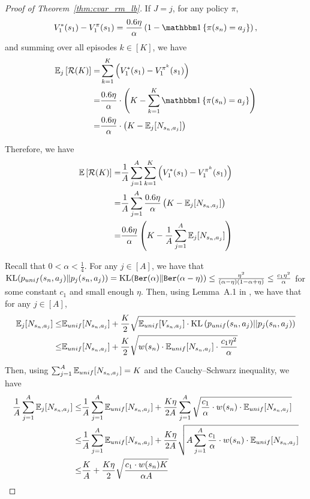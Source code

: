 \begin{proof}[Proof of Theorem~\ref{thm:cvar_rm_lb}]
	If $J=j$, for any policy $\pi$,
	\begin{align}
		V^{*}_1(s_1) - V^{\pi}_1(s_1) = \frac{0.6 \eta}{\alpha} \sbr{1-\indicator{\pi(s_n)=a_{j}}} , \label{eq:lb_proof_suboptimality_2}
	\end{align}
	and summing over all episodes $k \in [K]$, we have
	\begin{align*}
		\ex_j \mbr{\cR(K)} = & \sum_{k=1}^{K} \sbr{V^{*}_1(s_1)-V^{\pi^k}_1(s_1)}
		\\
		= & \frac{0.6 \eta}{\alpha} \cdot \sbr{K - \sum_{k=1}^{K} \indicator{\pi(s_n)=a_{j}}} 
		\\
		= & \frac{0.6 \eta}{\alpha} \cdot \sbr{K - \ex_j[N_{s_n,a_j}]} 
	\end{align*}
	
	Therefore, we have
	\begin{align}
		\mathbb{E} \left[ \mathcal{R}(K) \right] = &  \frac{1}{A} \sum_{j=1}^{A} \sum_{k=1}^{K} \left( V^{*}_1(s_1)-V^{\pi^k}_1(s_1) \right)
		\nonumber\\
		= & \frac{1}{A} \sum_{j=1}^{A} \frac{0.6 \eta}{\alpha} \left( K-\mathbb{E}_j[N_{s_n,a_j}]  \right) 
		\nonumber\\
		= & \frac{0.6 \eta}{\alpha} \left( K-\frac{1}{A} \sum_{j=1}^{A} \mathbb{E}_j[N_{s_n,a_j}]  \right) 
		\label{eq:regret_lb_half_2}
	\end{align}
	
	Recall that $0<\alpha<\frac{1}{4}$.
	For any $j \in [A]$, we have that $\textup{KL}(p_{unif}(s_n,a_j)\|p_j(s_n,a_j)) = \textup{KL}(\mathtt{Ber}(\alpha)\|\mathtt{Ber}(\alpha-\eta)) \leq \frac{\eta^2}{(\alpha-\eta) (1-\alpha+\eta)} \leq  \frac{c_1 \eta^2}{\alpha}$ for some constant $c_1$ and small enough $\eta$.
	Then, using Lemma~A.1 in \citep{auer2002nonstochastic}, we have that for any $j \in [A]$,
	\begin{align*}
		\mathbb{E}_j[N_{s_n,a_j}] \leq & \mathbb{E}_{unif}[N_{s_n,a_j}] + \frac{K}{2} \sqrt{ \mathbb{E}_{unif}[V_{s_n,a_j}] \cdot \textup{KL}\left( p_{unif}(s_n,a_j)||p_j(s_n,a_j) \right) }
		\nonumber\\
		\leq & \mathbb{E}_{unif}[N_{s_n,a_j}] + \frac{K}{2} \sqrt{ w(s_n) \cdot \mathbb{E}_{unif}[N_{s_n,a_j}] \cdot \frac{c_1 \eta^2}{\alpha} } 
	\end{align*}
	
	Then, using $\sum_{j=1}^{A} \mathbb{E}_{unif}[N_{s_n,a_j}]=K$ and the Cauchy–Schwarz inequality, we have
	\begin{align}
		\frac{1}{A} \sum_{j=1}^{A} \mathbb{E}_j[N_{s_n,a_j}] 
		\leq & \frac{1}{A} \sum_{j=1}^{A} \mathbb{E}_{unif}[N_{s_n,a_j}] +   \frac{K \eta}{2A} \sum_{j=1}^{A} \sqrt{ \frac{c_1}{\alpha} \cdot w(s_n) \cdot \mathbb{E}_{unif}[N_{s_n,a_j}] } 
		\nonumber\\
		\leq & \frac{1}{A} \sum_{j=1}^{A} \mathbb{E}_{unif}[N_{s_n,a_j}] +   \frac{K \eta}{2A} \sqrt{ A \sum_{j=1}^{A} \frac{c_1}{\alpha} \cdot w(s_n) \cdot \mathbb{E}_{unif}[N_{s_n,a_j}] } 
		\nonumber\\
		\leq & \frac{K}{A}  +  \frac{K \eta}{2} \sqrt{ \frac{ c_1 \cdot w(s_n) K}{\alpha A}  }  \label{eq:avg_N_a_j_2}
	\end{align}
	

\end{proof}
